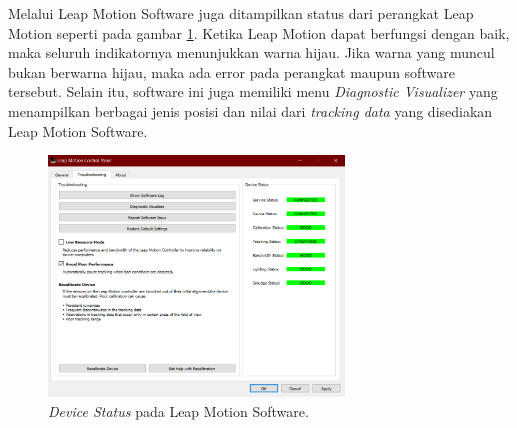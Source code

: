 		Melalui Leap Motion Software juga ditampilkan status dari perangkat Leap Motion seperti pada gambar \ref{fig:lm_status}. Ketika Leap Motion dapat berfungsi dengan baik, maka seluruh indikatornya menunjukkan warna hijau. Jika warna yang muncul bukan berwarna hijau, maka ada error pada perangkat maupun software tersebut. Selain itu, software ini juga memiliki menu \textit{Diagnostic Visualizer} yang menampilkan berbagai jenis posisi dan nilai dari \textit{tracking data} yang disediakan Leap Motion Software.
		\begin{figure} [H]
			\includegraphics[width=0.7\textwidth]{img/bab3/lm_status.png}
			\caption{\textit{Device Status} pada Leap Motion Software.}
			\label{fig:lm_status}
		\end{figure}
		\vspace{-2ex}
	\vspace{1.5ex}
	
